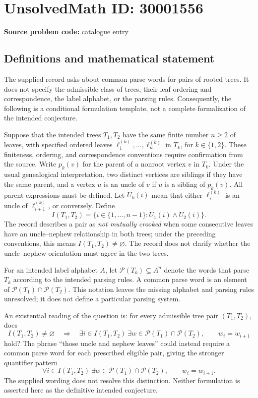 \documentclass[11pt]{article}
\begin{document}
\section*{UnsolvedMath ID: 30001556}
\textbf{Source problem code:} catalogue entry
\subsection{Definitions and mathematical statement}
The supplied record asks about common parse words for pairs of rooted trees. It does not specify the admissible class of trees, their leaf ordering and correspondence, the label alphabet, or the parsing rules. Consequently, the following is a conditional formulation template, not a complete formalization of the intended conjecture.

Suppose that the intended trees \(T_1,T_2\) have the same finite number \(n\geq 2\) of leaves, with specified ordered leaves \(\ell^{(k)}_1,\ldots,\ell^{(k)}_n\) in \(T_k\), for \(k\in\{1,2\}\). These finiteness, ordering, and correspondence conventions require confirmation from the source. Write \(p_k(v)\) for the parent of a nonroot vertex \(v\) in \(T_k\). Under the usual genealogical interpretation, two distinct vertices are siblings if they have the same parent, and a vertex \(u\) is an uncle of \(v\) if \(u\) is a sibling of \(p_k(v)\). All parent expressions must be defined. Let \(U_k(i)\) mean that either \(\ell^{(k)}_i\) is an uncle of \(\ell^{(k)}_{i+1}\), or conversely. Define
\[
I(T_1,T_2)=\{i\in\{1,\ldots,n-1\}:U_1(i)\land U_2(i)\}.
\]
The record describes a pair as \emph{not mutually crooked} when some consecutive leaves have an uncle--nephew relationship in both trees; under the preceding conventions, this means \(I(T_1,T_2)\neq\varnothing\). The record does not clarify whether the uncle--nephew orientation must agree in the two trees.

For an intended label alphabet \(A\), let \(\mathcal P(T_k)\subseteq A^n\) denote the words that parse \(T_k\) according to the intended parsing rules. A common parse word is an element of \(\mathcal P(T_1)\cap\mathcal P(T_2)\). This notation leaves the missing alphabet and parsing rules unresolved; it does not define a particular parsing system.

An existential reading of the question is: for every admissible tree pair \((T_1,T_2)\), does
\[
I(T_1,T_2)\neq\varnothing
\quad\Longrightarrow\quad
\exists i\in I(T_1,T_2)\ \exists w\in\mathcal P(T_1)\cap\mathcal P(T_2),\qquad w_i=w_{i+1}
\]
hold? The phrase ``those uncle and nephew leaves'' could instead require a common parse word for each prescribed eligible pair, giving the stronger quantifier pattern
\[
\forall i\in I(T_1,T_2)\ \exists w\in\mathcal P(T_1)\cap\mathcal P(T_2),\qquad w_i=w_{i+1}.
\]
The supplied wording does not resolve this distinction. Neither formulation is asserted here as the definitive intended conjecture.
\end{document}
